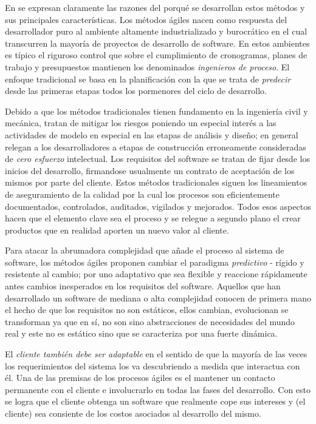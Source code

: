En \cite{koch} se expresan claramente las razones del porqué se desarrollan estos métodos y sus principales características. Los métodos ágiles nacen como respuesta del desarrollador puro al ambiente altamente industrializado y burocrático en el cual transcurren la mayoría de proyectos de desarrollo de software. En estos ambientes es típico el riguroso control que sobre el cumplimiento de cronogramas, planes de trabajo y presupuestos mantienen los denominados \textit{ingenieros de proceso}. El enfoque tradicional se basa en la planificación con la que se trata de \textit{predecir} desde las primeras etapas todos los pormenores del ciclo de desarrollo.

Debido a que los métodos tradicionales tienen fundamento en la ingeniería civil y mecánica, tratan de mitigar los riesgos poniendo un especial interés a las actividades de modelo en especial en las etapas de análisis y diseño; en general relegan a los desarrolladores a etapas de construcción erroneamente consideradas de \textit{cero esfuerzo} intelectual. Los requisitos del software se tratan de fijar desde los inicios del desarrollo, firmandose usualmente un contrato de aceptación de los mismos por parte del cliente. Estos métodos tradicionales siguen los lineamientos de aseguramiento de la calidad por la cual los procesos son eficientemente documentados, controlados, auditados, vigilados y mejorados. Todos esos aspectos hacen que el elemento clave sea el proceso y se relegue a segundo plano el crear productos que en realidad aporten un nuevo valor al cliente.

Para atacar la abrumadora complejidad que añade el proceso al sistema de software, los métodos ágiles proponen cambiar el paradigma \textit{predictivo} - rígido y resistente al cambio; por uno adaptativo que sea flexible y reaccione rápidamente antes cambios inesperados en los requisitos del software. Aquellos que han desarrollado un software de mediana o alta complejidad conocen de primera mano el hecho de que los requisitos no son estáticos, ellos cambian, evolucionan se transforman ya que en sí, no son sino abstracciones de necesidades del mundo real y este no es estático sino que se caracteriza por una fuerte dinámica.

El \textit{cliente también debe ser adaptable} en el sentido de que la mayoría de las veces los requerimientos del sistema los va descubriendo a medida que interactua con él. Una de las premisas de los procesos ágiles es el mantener un contacto permanente con el cliente e involucrarlo en todas las fases del desarrollo. Con esto se logra que el cliente obtenga un software que realmente cope sus intereses y (el cliente) sea consiente de los costos asociados al desarrollo del mismo.

